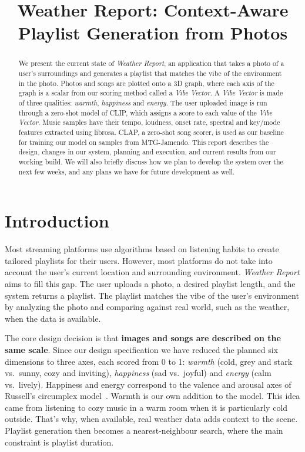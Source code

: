 \documentclass{article}
\title{Weather Report: Context-Aware Playlist Generation from Photos}
\begin{document}
\maketitle

\begin{abstract}
We present the current state of \emph{Weather Report}, an application that takes a
photo of a user's surroundings and generates a playlist that matches the vibe of the environment in the photo. 
Photos and songs are plotted onto a 3D graph, where each axis of the graph is a scalar from 
our scoring method called a \emph{Vibe Vector}. A \emph{Vibe Vector} is made of three qualities:  
\emph{warmth}, \emph{happiness} and \emph{energy}. The user uploaded image is run through a zero-shot model of CLIP, 
which assigns a score to each value of the \emph{Vibe Vector}. Music samples have their tempo,
loudness, onset rate, spectral and key/mode features extracted using librosa.
CLAP, a zero-shot song scorer, is used as our baseline for training our model on samples from MTG-Jamendo. 
This report describes the design, changes in our system, planning and execution, and current results 
from our working build. We will also briefly discuss how we plan to develop the system over the next few weeks, 
and any plans we have for future development as well. 
\end{abstract}

\section{Introduction}\label{sec:intro}

Most streaming platforms use algorithms based on listening habits to create tailored playlists
for their users. However, most platforms do not take into account the user's current location
and surrounding environment. \emph{Weather Report} aims to fill this gap. The user uploads a photo,
a desired playlist length, and the system returns a playlist. The playlist matches the vibe of the user's 
environment by analyzing the photo and comparing against real world, such as the weather, when the data is 
available. 

The core design decision is that \textbf{images and songs are described on the
same scale}. Since our design specification we have reduced the planned six
dimensions to three axes, each scored from 0 to 1:
\emph{warmth} (cold, grey and stark vs.\ sunny, cozy and inviting),
\emph{happiness} (sad vs.\ joyful) and \emph{energy} (calm vs.\ lively).
Happiness and energy correspond to the valence and arousal axes of Russell's
circumplex model~\cite{russell1980circumplex}. Warmth is our own
addition to the model. This idea came from listening to cozy music in a warm room when it is
particularly cold outside. That's why, when available, real weather data adds context to the scene. Playlist
generation then becomes a nearest-neighbour search, where the main constraint is playlist duration.
\end{document}
